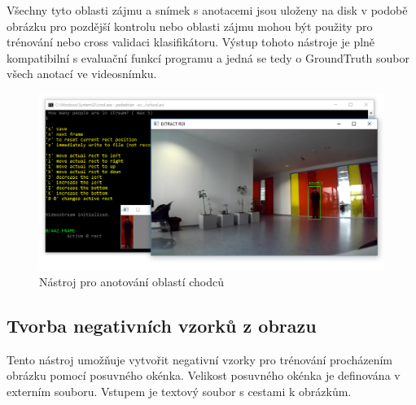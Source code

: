 Všechny tyto oblasti zájmu a snímek s anotacemi jsou uloženy na disk v podobě obrázku pro pozdější kontrolu nebo oblasti zájmu mohou být použity pro trénování nebo cross validaci klasifikátoru. Výstup tohoto nástroje je plně kompatibilní s evaluační funkcí programu a jedná se tedy o GroundTruth soubor všech anotací ve videosnímku.
 \begin{figure}[H]
\centering
\includegraphics[width=15cm]{figures/annotation_example}
\caption{Nástroj pro anotování oblastí chodců}
\label{tool_anotate}
\end{figure}

\subsection{Tvorba negativních vzorků z obrazu}
Tento nástroj umožňuje vytvořit negativní vzorky pro trénování procházením obrázku pomocí posuvného okénka. Velikost posuvného okénka je definována v externím souboru. Vstupem je textový soubor s cestami k obrázkům.
